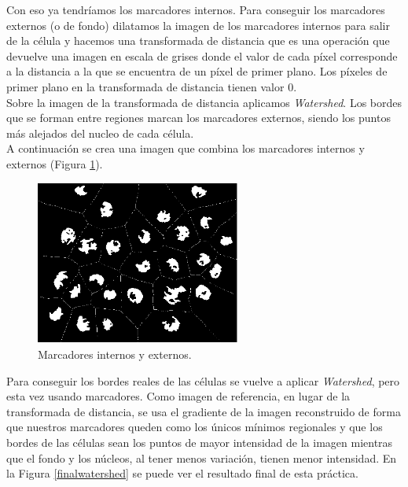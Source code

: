 \documentclass[a4paper,12pt]{report}
\begin{document}
Con eso ya tendríamos los marcadores internos. Para conseguir los marcadores externos (o de fondo) dilatamos la imagen de los marcadores internos para salir de la célula y hacemos una transformada de distancia que es una operación que devuelve una imagen en escala de grises donde el valor de cada píxel corresponde a la distancia a la que se encuentra de un píxel de primer plano. Los píxeles de primer plano en la transformada de distancia tienen valor 0.\\

Sobre la imagen de la transformada de distancia aplicamos  \emph{Watershed}. Los bordes que se forman entre regiones marcan los marcadores externos, siendo los puntos más alejados del nucleo de cada célula.\\

A continuación se crea una imagen que combina los marcadores internos y externos (Figura \ref{marcadores}). \\

\begin{figure}[h]
\centering
\includegraphics[width=0.6\textwidth]{imagenes/marcadores}
\caption{Marcadores internos y externos.}
\label{marcadores} 
\end{figure}

Para conseguir los bordes reales de las células se vuelve a aplicar  \emph{Watershed}, pero esta vez usando marcadores. Como imagen de referencia, en lugar de la transformada de distancia, se usa el gradiente de la imagen reconstruido de forma que nuestros marcadores queden como los únicos mínimos regionales y que los bordes de las células sean los puntos de mayor intensidad de la imagen mientras que el fondo y los núcleos, al tener menos variación, tienen menor intensidad. En la Figura \ref{finalwatershed} se puede ver el resultado final de esta práctica.\\
\end{document}
